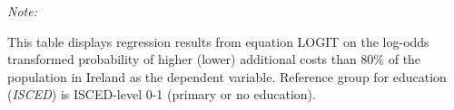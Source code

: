 \begin{table}[htbp!]
\begin{adjustbox}{width = 1\textwidth, max height = 0.95\textheight, center}
\begin{threeparttable}[b]
         \begin{tablenotes}\item \medskip \textit{Note:}
            \item This table displays regression results from equation LOGIT on the log-odds transformed probability of higher (lower) additional costs than 80\% of the population in Ireland as the dependent variable. Reference group for education (\textit{ISCED}) is ISCED-level 0-1 (primary or no education).
         \end{tablenotes}
      \end{threeparttable}
   \end{adjustbox}
\end{table}


